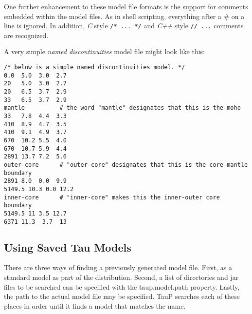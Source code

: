 One further enhancement to these model file formats is the support for comments
embedded within the model files. As in shell scripting, everything after 
a \# on a line is ignored. In addition, \textit{C} style \verb"/* ... */" 
and \textit{C++} style \verb"// ..." comments are recognized.

A very simple \textit{named discontinuities} model file might look like this:
\begin{verbatim}/* below is a simple named discontinuities model. */
0.0  5.0  3.0  2.7
20   5.0  3.0  2.7
20   6.5  3.7  2.9
33   6.5  3.7  2.9
mantle          # the word "mantle" designates that this is the moho
33   7.8  4.4  3.3
410  8.9  4.7  3.5
410  9.1  4.9  3.7
670  10.2 5.5  4.0
670  10.7 5.9  4.4
2891 13.7 7.2  5.6
outer-core      # "outer-core" designates that this is the core mantle boundary
2891 8.0  0.0  9.9
5149.5 10.3 0.0 12.2
inner-core      # "inner-core" makes this the inner-outer core boundary
5149.5 11 3.5 12.7
6371 11.3  3.7  13 \end{verbatim}

\subsection{Using Saved Tau Models}
There are three ways of finding a previously generated model file. First, as
a standard model as part of the distribution. Second, a list of directories and jar files to
be searched can be specified with the taup.model.path property.
Lastly, the path to the actual model file may be specified.
TauP searches each of these
places in order until it finds a model that matches the name.

